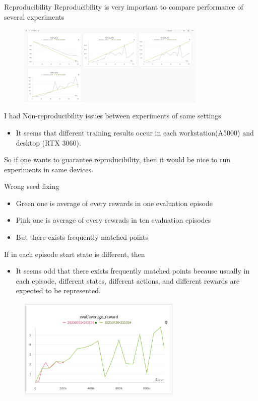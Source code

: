 \documentclass[8pt]{beamer}
\begin{document}
\begin{frame}{Reproducibility}
    Reproducibility is very important to compare performance of several experiments
    \begin{figure}
        \centering
        \includegraphics[width=0.8\textwidth]{UnmatchedReprod.png}
    \end{figure}
    I had Non-reproducibility issues between experiments of same settings
    \begin{itemize}
        \item It seems that different training results occur in each workstation(A5000) and desktop (RTX 3060).
    \end{itemize}
    So if one wants to guarantee reproducibility, then it would be nice to run experiments in same devices.
\end{frame}

\begin{frame}{Wrong seed fixing}
    \begin{itemize}
        \item Green one is average of every rewards in one evaluation episode
        \item Pink one is average of every rewrads in ten evaluation episodes
        \item But there exists frequently matched points
    \end{itemize}

    If in each episode start state is different, then
    \begin{itemize}
        \item It seems odd that there exists frequently matched points because usually in each episode, different states, different actions, and different rewards are expected to be represented.
    \end{itemize}

    \begin{figure}
        \includegraphics[width=0.7\textwidth]{WrongSeedSetting.png}
    \end{figure}
\end{frame}
\end{document}
